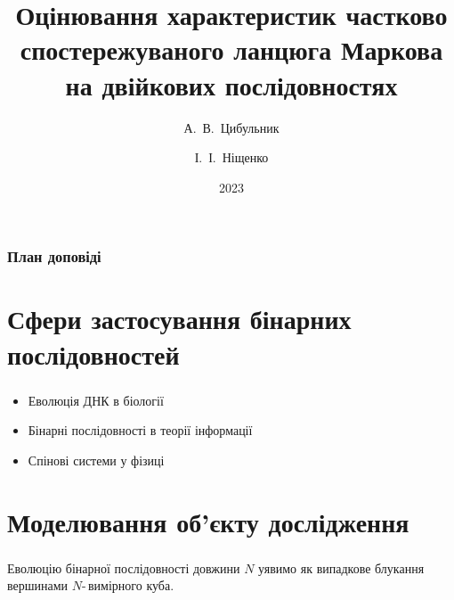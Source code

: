 \documentclass[12pt,mathserif]{beamer}
\title[Оцінювання характеристик ланцюга Маркова]{Оцінювання характеристик частково спостережуваного ланцюга Маркова на двійкових послідовностях}
\author[Цибульник, Ніщенко]{А.~В.~Цибульник \and І.~І.~Ніщенко}
\institute[Науково-практична конференція студентів]{Всеукраїнська науково-практична конференція студентів, аспірантів та молодих вчених}
\date{2023}
\theoremstyle{plain}
\begin{document}
\begin{frame}
    \titlepage
\end{frame}

\begin{frame}
    \frametitle{План доповіді}
    \tableofcontents
\end{frame}


\section{Сфери застосування бінарних послідовностей}

\begin{frame}
    \frametitle{\insertsection} 
    \begin{itemize}
        \item Еволюція ДНК в біології \vspace{1cm}
        \item Бінарні послідовності в теорії інформації \vspace{1cm}
        \item Спінові системи у фізиці
    \end{itemize}
\end{frame}

\section{Моделювання об'єкту дослідження}

\begin{frame}
    \frametitle{\insertsection}
    Еволюцію бінарної послідовності довжини $N$ уявимо як випадкове блукання вершинами $N$-\,вимірного куба.  
    \begin{figure}[H]\centering
        
    \end{figure}
\end{frame}
\end{document}
